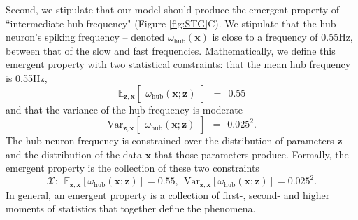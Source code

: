 \documentclass[11pt]{article}
\begin{document}

Second, we stipulate that our model should produce the emergent property of ``intermediate hub frequency" (Figure \ref{fig:STG}C).
We stipulate that the hub neuron's spiking frequency -- denoted $\omega_{\text{hub}}(\mathbf{x})$ is close to a frequency of 0.55Hz, between that of the slow and fast frequencies.
Mathematically, we define this emergent property with two statistical constraints: that the mean hub frequency is 0.55Hz,
\begin{equation}\label{eq:EP_STG1}
 \mathbb{E}_{\mathbf{z},\mathbf{x}}\begin{bmatrix} \omega_{\text{hub}}(\mathbf{x}; \mathbf{z}) \end{bmatrix}  ~~=~~  0.55 
\end{equation}
and that the variance of the hub frequency is moderate
\begin{equation}\label{eq:EP_STG2}
\text{Var}_{\mathbf{z},\mathbf{x}}\begin{bmatrix} \omega_{\text{hub}}(\mathbf{x}; \mathbf{z}) \end{bmatrix}  ~~=~~   0.025^2.
\end{equation}
The hub neuron frequency is constrained over the distribution of parameters $\mathbf{z}$  and the distribution of the data $\mathbf{x}$ that those parameters produce.
Formally, the emergent property is the collection of these two constraints
\begin{equation}\label{eq:EP_STG}
\mathcal{X}:~~ \mathbb{E}_{\mathbf{z},\mathbf{x}}\left[\omega_{\text{hub}}(\mathbf{x}; \mathbf{z})\right] = 0.55,~~\text{Var}_{\mathbf{z},\mathbf{x}}\left[\omega_{\text{hub}}(\mathbf{x}; \mathbf{z})\right] =0.025^2.
\end{equation}
In general, an emergent property is a collection of first-, second- and higher moments of  statistics that together define the phenomena.
\end{document}
